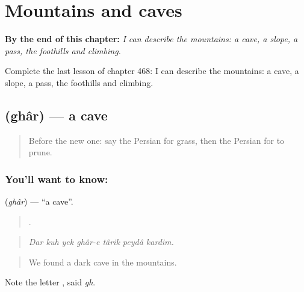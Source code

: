 
\chapter{Mountains and caves}
\label{ch:fa-mountains-and-caves}

\begin{chapteropening}
\textbf{By the end of this chapter:} \emph{I can describe the mountains: a cave, a slope, a pass, the foothills and climbing.}

Complete the last lesson of chapter 468: I can describe the mountains: a cave, a slope, a pass, the foothills and climbing.
\end{chapteropening}

\section[\texorpdfstring{\fa{غار} (ghâr)}{غار (ghâr)}]{ (ghâr) — a cave}

\label{lesson:FA-C468-ghar}



\begin{quote}
Before the new one: say the Persian for grass, then the Persian for to prune.
\end{quote}

\subsection*{You'll want to know: }
\textbf{} (\emph{ghâr}) — \textquotedblleft{}a cave\textquotedblright{}.

\begin{quote}
      .
\end{quote}

\begin{quote}
\emph{Dar kuh yek ghâr-e târik peydâ kardim.}
\end{quote}

\begin{quote}
We found a dark cave in the mountains.
\end{quote}

Note the letter , said \emph{gh}.

